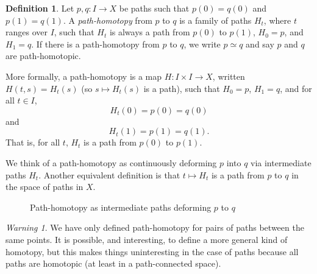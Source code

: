 \documentclass{article}
\theoremstyle{definition}
\newtheorem{defi}[thm]{Definition}
\theoremstyle{remark}
\newtheorem*{war}{Warning}
\numberwithin{figure}{section}
\begin{document}
\begin{defi}
	Let $p, q : I \to X$ be paths such that $p(0) = q(0)$ and $p(1) = q(1)$. A \emph{path-homotopy} from $p$ to $q$ is a family of paths $H_t$, where $t$ ranges over $I$, such that $H_t$ is always a path from $p(0)$ to $p(1)$, $H_0 = p$, and $H_1 = q$. If there is a path-homotopy from $p$ to $q$, we write $p \simeq q$ and say $p$ and $q$ are path-homotopic.
	
	More formally, a path-homotopy is a map $H : I \times I \to X$, written $H(t, s) = H_t(s)$ (so $s \mapsto H_t(s)$ is a path), such that $H_0 = p$, $H_1 = q$, and for all $t \in I$,
	\[
	H_t(0) = p(0) = q(0)
	\]
	and
	\[
	H_t(1) = p(1) = q(1).
	\]
	That is, for all $t$, $H_t$ is a path from $p(0)$ to $p(1)$.
\end{defi}

We think of a path-homotopy as continuously deforming $p$ into $q$ via intermediate paths $H_t$. Another equivalent definition is that $t \mapsto H_t$ is a path from $p$ to $q$ in the space of paths in $X$.

\begin{figure}[h]
	\centering
	\caption{Path-homotopy as intermediate paths deforming $p$ to $q$}
	\label{fig:path-homotopy visual}
\end{figure}

\color{red}
\begin{war}
	We have only defined path-homotopy for pairs of paths between the same points. It is possible, and interesting, to define a more general kind of homotopy, but this makes things uninteresting in the case of paths because all paths are homotopic (at least in a path-connected space).
\end{war}
\color{black}
\end{document}
